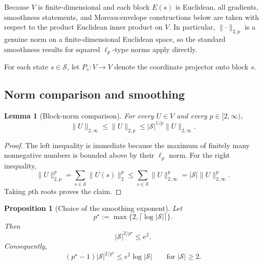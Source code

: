 \documentclass{article}
\newtheorem{proposition}[theorem]{Proposition}
\newtheorem{lemma}[theorem]{Lemma}
\newcommand{\X}{\mathcal{S}}
\begin{document}
Because $V$ is finite-dimensional and each block $E(s)$ is Euclidean, all gradients, smoothness statements, and Moreau-envelope constructions below are taken with respect to the product Euclidean inner product on $V$. In particular, $\lVert \cdot \rVert_{2,p}$ is a genuine norm on a finite-dimensional Euclidean space, so the standard smoothness results for squared $\ell_p$-type norms apply directly.

For each state $s\in \X$, let $P_s:V\to V$ denote the coordinate projector onto block $s$.

\subsection{Norm comparison and smoothing}

\begin{lemma}[Block-norm comparison]
\label{lem:block-norm-comparison}
For every $U\in V$ and every $p\in[2,\infty)$,
\begin{equation}
\lVert U \rVert_{2,\infty} \le \lVert U \rVert_{2,p} \le \lvert \X \rvert^{1/p}\lVert U \rVert_{2,\infty}.
\end{equation}
\end{lemma}

\begin{proof}
The left inequality is immediate because the maximum of finitely many nonnegative numbers is bounded above by their $\ell_p$ norm. For the right inequality,
\begin{equation}
\lVert U \rVert_{2,p}^p = \sum_{s\in \X}\lVert U(s) \rVert_2^p \le \sum_{s\in \X}\lVert U \rVert_{2,\infty}^p = \lvert \X \rvert \lVert U \rVert_{2,\infty}^p.
\end{equation}
Taking $p$th roots proves the claim.
\end{proof}

\begin{proposition}[Choice of the smoothing exponent]
\label{prop:pstar-choice}
Let
\begin{equation}
p^\star := \max\{2,\lceil \log \lvert \X \rvert\rceil\}.
\end{equation}
Then
\begin{equation}
\lvert \X \rvert^{2/p^\star} \le e^2.
\end{equation}
Consequently,
\begin{equation}
(p^\star-1)\lvert \X \rvert^{2/p^\star} \le e^2 \log \lvert \X \rvert \qquad\text{for }\lvert \X \rvert\ge 2.
\end{equation}
\end{proposition}
\end{document}
